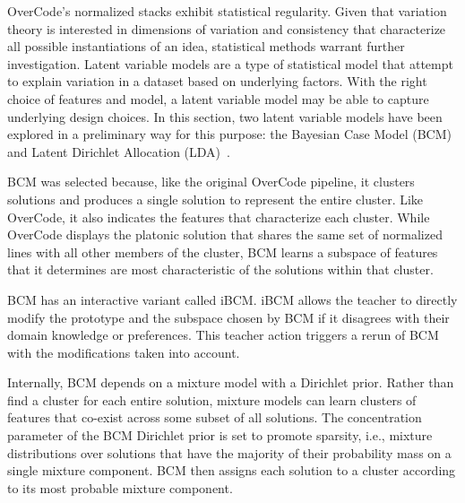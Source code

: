 
OverCode's normalized stacks exhibit statistical regularity. Given that variation theory is interested in dimensions of variation and consistency that characterize all possible instantiations of an idea, statistical methods warrant further investigation. Latent variable models are a type of statistical model that attempt to explain variation in a dataset based on underlying factors. With the right choice of features and model, a latent variable model may be able to capture underlying design choices. In this section, two latent variable models have been explored in a preliminary way for this purpose: the Bayesian Case Model (BCM)~\cite{} and Latent Dirichlet Allocation (LDA)~\cite{}. 

BCM was selected because, like the original OverCode pipeline, it clusters solutions and produces a single solution to represent the entire cluster. Like OverCode, it also indicates the features that characterize each cluster. While OverCode displays the platonic solution that shares the same set of normalized lines with all other members of the cluster, BCM learns a subspace of features that it determines are most characteristic of the solutions within that cluster. 

BCM has an interactive variant called iBCM. iBCM allows the teacher to directly modify the prototype and the subspace chosen by BCM if it disagrees with their domain knowledge or preferences. This teacher action triggers a rerun of BCM with the modifications taken into account.%

Internally, BCM depends on a mixture model with a Dirichlet prior. Rather than find a cluster for each entire solution, mixture models can learn clusters of features that co-exist across some subset of all solutions. The concentration parameter of the BCM Dirichlet prior is set to promote sparsity, i.e., mixture distributions over solutions that have the majority of their probability mass on a single mixture component. BCM then assigns each solution to a cluster according to its most probable mixture component. %

